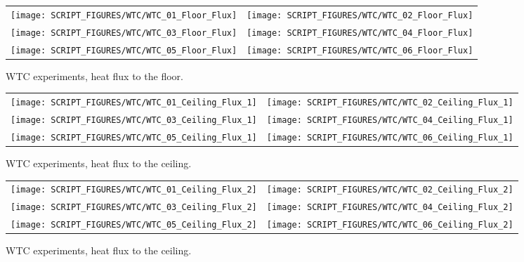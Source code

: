 \newpage

\begin{figure}[p]
\begin{tabular*}{\textwidth}{l@{\extracolsep{\fill}}r}
\texttt{[image: SCRIPT\_FIGURES/WTC/WTC\_01\_Floor\_Flux]} &
\texttt{[image: SCRIPT\_FIGURES/WTC/WTC\_02\_Floor\_Flux]} \\
\texttt{[image: SCRIPT\_FIGURES/WTC/WTC\_03\_Floor\_Flux]} &
\texttt{[image: SCRIPT\_FIGURES/WTC/WTC\_04\_Floor\_Flux]} \\
\texttt{[image: SCRIPT\_FIGURES/WTC/WTC\_05\_Floor\_Flux]} &
\texttt{[image: SCRIPT\_FIGURES/WTC/WTC\_06\_Floor\_Flux]}
\end{tabular*}
\caption{WTC experiments, heat flux to the floor.}
\label{NIST_WTC_Floor_Flux}
\end{figure}

\begin{figure}[p]
\begin{tabular*}{\textwidth}{l@{\extracolsep{\fill}}r}
\texttt{[image: SCRIPT\_FIGURES/WTC/WTC\_01\_Ceiling\_Flux\_1]} &
\texttt{[image: SCRIPT\_FIGURES/WTC/WTC\_02\_Ceiling\_Flux\_1]} \\
\texttt{[image: SCRIPT\_FIGURES/WTC/WTC\_03\_Ceiling\_Flux\_1]} &
\texttt{[image: SCRIPT\_FIGURES/WTC/WTC\_04\_Ceiling\_Flux\_1]} \\
\texttt{[image: SCRIPT\_FIGURES/WTC/WTC\_05\_Ceiling\_Flux\_1]} &
\texttt{[image: SCRIPT\_FIGURES/WTC/WTC\_06\_Ceiling\_Flux\_1]}
\end{tabular*}
\caption{WTC experiments, heat flux to the ceiling.}
\label{NIST_WTC_Ceiling_Flux_1}
\end{figure}

\begin{figure}[p]
\begin{tabular*}{\textwidth}{l@{\extracolsep{\fill}}r}
\texttt{[image: SCRIPT\_FIGURES/WTC/WTC\_01\_Ceiling\_Flux\_2]} &
\texttt{[image: SCRIPT\_FIGURES/WTC/WTC\_02\_Ceiling\_Flux\_2]} \\
\texttt{[image: SCRIPT\_FIGURES/WTC/WTC\_03\_Ceiling\_Flux\_2]} &
\texttt{[image: SCRIPT\_FIGURES/WTC/WTC\_04\_Ceiling\_Flux\_2]} \\
\texttt{[image: SCRIPT\_FIGURES/WTC/WTC\_05\_Ceiling\_Flux\_2]} &
\texttt{[image: SCRIPT\_FIGURES/WTC/WTC\_06\_Ceiling\_Flux\_2]}
\end{tabular*}
\caption{WTC experiments, heat flux to the ceiling.}
\label{NIST_WTC_Ceiling_Flux_2}
\end{figure}


